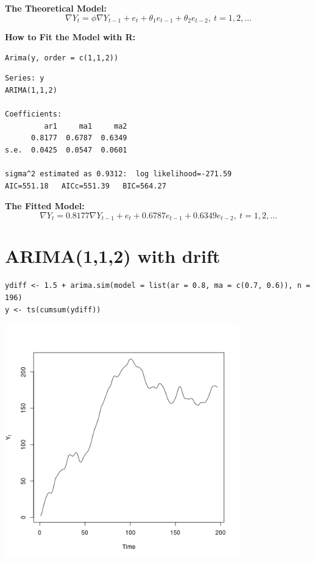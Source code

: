 \documentclass[12pt]{article}
\begin{document}
\noindent
\textbf{The Theoretical Model:} 
\[
\nabla Y_{t} = \phi \nabla Y_{t - 1} +  e_{t} + \theta_{1} e_{t - 1} + \theta_{2} e_{t - 2},\ t = 1,2,\ldots
\]

\noindent
\textbf{How to Fit the Model with R:}


\begin{verbatim}
Arima(y, order = c(1,1,2))
\end{verbatim}




\begin{verbatim}
Series: y 
ARIMA(1,1,2)                    

Coefficients:
         ar1     ma1     ma2
      0.8177  0.6787  0.6349
s.e.  0.0425  0.0547  0.0601

sigma^2 estimated as 0.9312:  log likelihood=-271.59
AIC=551.18   AICc=551.39   BIC=564.27
\end{verbatim}

\noindent
\textbf{The Fitted Model:} 
\[
\nabla Y_{t} = 0.8177 \nabla Y_{t - 1} + e_{t} + 0.6787 e_{t - 1} + 0.6349 e_{t - 2},\ t = 1,2,\ldots
\]
\section*{ARIMA(1,1,2) with drift}
\label{sec-8}


\begin{verbatim}
ydiff <- 1.5 + arima.sim(model = list(ar = 0.8, ma = c(0.7, 0.6)), n = 196)
y <- ts(cumsum(ydiff))
\end{verbatim}





\includegraphics[width=4.0in]{img/arima112nzm.png}
\end{document}
